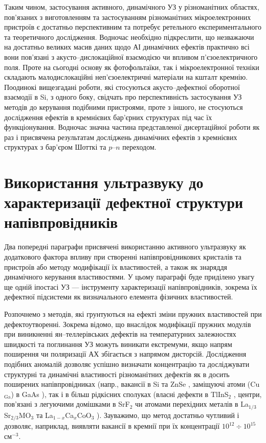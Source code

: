 Таким чином, застосування активного, динамічного УЗ у різноманітних областях, пов'язаних з виготовленням та застосуванням різноманітних мікроелектронних пристроїв є достатньо перспективним та потребує ретельного експериментального та теоретичного дослідження.
Водночас необхідно підкреслити, що незважаючи на достатньо великих масив даних щодо АІ динамічних ефектів практично всі вони пов'язані з акусто--дислокаційної взаємодією чи впливом п'єзоелектричного поля.
Проте на сьогодні основу як фотофольтаїки, так і мікроелектронної техніки складають малодислокаційні неп'єзоелектричні матеріали на кшталт кремнію.
Поодинокі вищезгадані роботи, які стосуються акусто--дефектної оборотної взаємодії в Si, з одного боку,
свідчать про перспективність застосування УЗ методів до керування подібними пристроями,
проте з іншого, не стосуються дослідження ефектів в кремнієвих бар'єрних структурах під час їх функціонування.
Водночас значна частина представленої дисертаційної роботи як раз і присвячена результатам досліджень динамічних ефектів з кремнієвих структурах з бар'єром Шотткі та $p$--$n$ переходом.


\section{Використання ультразвуку до характеризації дефектної структури напівпровідників\label{secUSMethod}}

Два попередні параграфи присвячені використанню активного ультразвуку як додаткового фактора впливу при створенні напівпровідникових кристалів та пристроїв або  методу модифікації їх властивостей, а також як знаряддя динамічного керування властивостями.
У цьому параграфі буде приділено увагу ще одній іпостасі УЗ --- інструменту характеризації напівпровідників, зокрема їх дефектної підсистеми як визначального елемента фізичних властивостей.


Розпочнемо з методів, які грунтуються на ефекті зміни пружних властивостей при дефектоутворенні.
Зокрема відомо, що внаслідок модифікації пружних модулів при виникненні ян--теллерівських дефектів на температурних залежностях швидкості та поглинання УЗ можуть виникати екстремуми, якщо напрям поширення чи поляризації АХ збігається з напрямом дисторсій.
Дослідження подібних аномалій дозволяє успішно визначати концентрацію та досліджувати структурні та динамічні властивості
різноманітних дефектів як в досить поширених напівпровідниках (напр., вакансії в Si \cite{USM:Goto2006,USM:Okabe2013,USM:Mitsumoto2014,USM:Akatsu2009} та ZnSe \cite{USM:Averkin2014},
заміщуючі атоми (Cu$_\text{Ga}$) в GaAs \cite{USM:Averkin2014:2}),
так і в більш рідкісних сполуках (власні дефекти в TlInS$_2$ \cite{USM:SEYIDOV2016}, центри, пов'язані з легуючими домішками в SrF$_2$ \cite{USM:Zhevstovskikh} чи атомами перехідних металів в La$_{1/3}$Sr$_{2/3}$MO$_3$ \cite{USM:HUI2012} та La$_{1-x}$Ca$_x$CoO$_3$ \cite{USM:YI2009}).
Зауважимо, що метод достатньо чутливий і дозволяє, наприклад, виявляти вакансії в кремнії  при їх концентрації $10^{12}\div10^{15}$см$^{-3}$.


